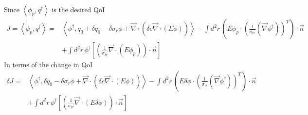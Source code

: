 \documentclass{article}
\newcommand{\bra}{\left\langle}
\newcommand{\ket}{\right\rangle}
\newcommand{\vdiv}{\vec{\nabla} \cdot}
\newcommand{\vgrad}{\vec{\nabla}}
\begin{document}
Since $\bra \phi_p, q^\dag \ket $ is the desired QoI
\begin{align*}
J = \bra \phi_p, q^\dag \ket =& \bra \phi^\dag , q_0 + \delta q_0 - \delta \sigma_r \phi + \vdiv \left( \delta c \vdiv \left( E \phi \right) \right)  \ket - \int d^2 r \, \left( E \phi_p \cdot \left( \frac{1}{ \sigma_{tr}} \left(  \vgrad \phi^\dag \right) \right)^T \right) \cdot \vec{n} \\
&+ \int d^2 r \, \phi^\dag \left[ \left( \frac{1}{\sigma_{tr}} \vdiv \left( E \phi_p \right) \right) \cdot \vec{n} \right]
\end{align*}
In terms of the change in QoI
\begin{align*}
\delta J =& \bra \phi^\dag , \delta q_0 - \delta \sigma_r \phi + \vdiv \left( \delta c \vdiv \left( E \phi \right) \right)  \ket - \int d^2 r \, \left( E \delta \phi \cdot \left( \frac{1}{ \sigma_{tr}} \left(  \vgrad \phi^\dag \right) \right)^T \right) \cdot \vec{n} \\
&+ \int d^2 r \, \phi^\dag \left[ \left( \frac{1}{\sigma_{tr}} \vdiv \left( E \delta \phi \right) \right) \cdot \vec{n} \right]
\end{align*}
\end{document}
